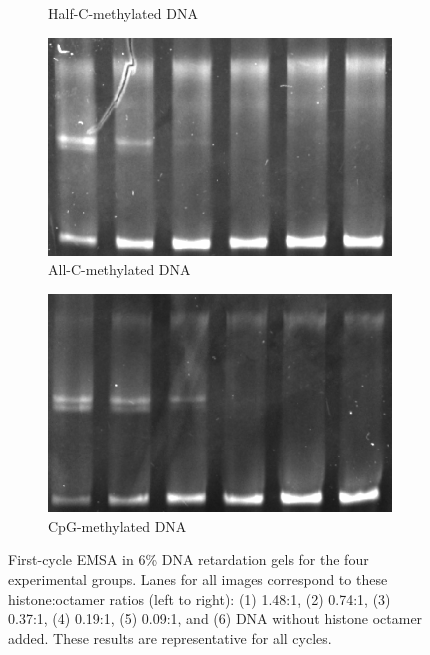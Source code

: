 \documentclass[parskip=full, numbers=noenddot]{scrreprt}
\begin{document}
\begin{figure}[htpb]
\begin{subfigure}[htpb]{0.4\textwidth}
    \caption{Half-C-methylated DNA}
    \label{fig:reconstnuc_b}
  \end{subfigure}
  \begin{subfigure}[htpb]{0.4\textwidth}
    \centering
    \includegraphics[width=\textwidth]{reconstnuc_c}
    \caption{All-C-methylated DNA}
    \label{fig:reconstnuc_c}
  \end{subfigure}
  \begin{subfigure}[htpb]{0.4\textwidth}
    \centering
    \includegraphics[width=\textwidth]{reconstnuc_d}
    \caption{CpG-methylated DNA}
    \label{fig:reconstnuc_d}
  \end{subfigure}
  \caption{First-cycle EMSA in 6\% DNA retardation gels for the four experimental groups.  Lanes for all images correspond to these histone:octamer ratios (left to right): (1) 1.48:1, (2) 0.74:1, (3) 0.37:1, (4) 0.19:1, (5) 0.09:1, and (6) DNA without histone octamer added.  These results are representative for all cycles.}
  \label{fig:reconstnuc}
\end{figure}
\end{document}
